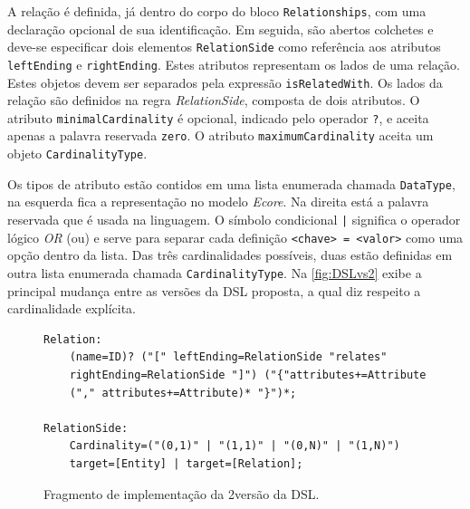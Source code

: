 A relação é definida, já dentro do corpo do bloco \texttt{Relationships}, com uma declaração opcional de sua identificação. 
Em seguida, são abertos colchetes e deve-se especificar dois elementos \texttt{RelationSide} como referência aos atributos \texttt{leftEnding} e \texttt{rightEnding}. 
Estes atributos representam os lados de uma relação. 
Estes objetos devem ser separados pela expressão \texttt{isRelatedWith}. 
Os lados da relação são definidos na regra \textit{RelationSide}, composta de dois atributos. 
O atributo \texttt{minimalCardinality} é opcional, indicado pelo operador \texttt{?}, e aceita apenas a palavra reservada \texttt{zero}. 
O atributo \texttt{maximumCardinality} aceita um objeto \texttt{CardinalityType}.

Os tipos de atributo estão contidos em uma lista enumerada chamada \texttt{DataType}, na esquerda fica a representação no modelo \textit{Ecore}. 
Na direita está a palavra reservada que é usada na linguagem. 
O símbolo condicional \texttt{|} significa o operador lógico \textit{OR} (ou) e serve para separar cada definição \texttt{<chave> = <valor>} como uma opção dentro da lista. 
Das três cardinalidades possíveis, duas estão definidas em outra lista enumerada chamada \texttt{CardinalityType}. 
Na \autoref{fig:DSLvs2} exibe a principal mudança entre as versões da \ac{DSL} proposta, a qual diz respeito a cardinalidade explícita. 

\lstset{basicstyle=\scriptsize}
\begin{figure}[!htb]
    \centering
    \caption{Fragmento de implementação da 2\degree versão da DSL.}
    \label{fig:DSLvs2}
    \begin{footnotesize}
\begin{lstlisting}[language = Xtext , frame = trbl]
Relation:
	(name=ID)? ("[" leftEnding=RelationSide "relates" 
	rightEnding=RelationSide "]") ("{"attributes+=Attribute 
	("," attributes+=Attribute)* "}")*;

RelationSide:
	Cardinality=("(0,1)" | "(1,1)" | "(0,N)" | "(1,N)")
	target=[Entity] | target=[Relation];
    \end{lstlisting}
    \end{footnotesize} 
\end{figure}


